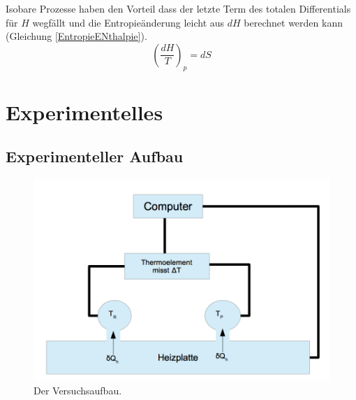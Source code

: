 \documentclass[a4paper,12pt,oneside,onecolum,final,openany]{report}
\begin{document}
Isobare Prozesse haben den Vorteil dass der letzte Term des totalen Differentials für $H$ wegfällt und die Entropieänderung leicht aus $dH$ berechnet werden kann (Gleichung \ref{EntropieENthalpie}).\\


\begin{equation} \label{EntropieEnthalpie}
\left(\frac{dH}{T}\right)_p = dS
\end{equation}


\chapter{Experimentelles}
\section{Experimenteller Aufbau}
\begin{figure}[h]
\centering
\includegraphics[width=13.5cm]{VB_SN.png}
\caption{Der Versuchsaufbau.}
\end{figure} 
\FloatBarrier
\end{document}
